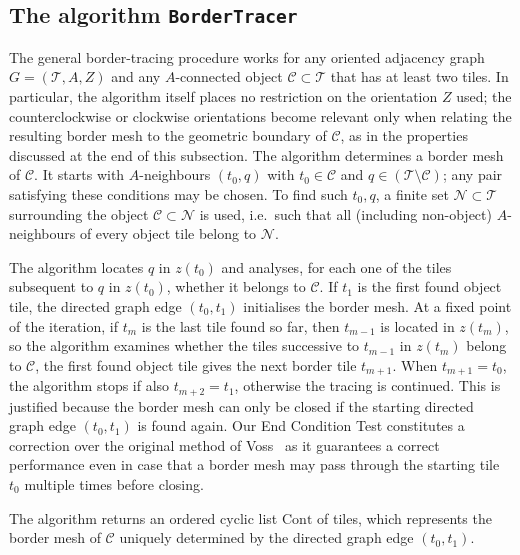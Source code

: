 \subsection{The algorithm \texttt{BorderTracer}}\label{subsec:bordertracer}

The general border-tracing procedure \cite[Algorithm~1]{WiederholdMatosWiederhold2026} works for any oriented adjacency graph $G = (\mathcal{T},A,Z)$ and any $A$-connected object $\mathcal{C}\subset\mathcal{T}$ that has at least two tiles.
In particular, the algorithm itself places no restriction on the orientation $Z$ used; the counterclockwise or clockwise orientations become relevant only when relating the resulting border mesh to the geometric boundary of $\mathcal{C}$, as in the properties discussed at the end of this subsection.
The algorithm determines a border mesh of $\mathcal{C}$.
It starts with $A$-neighbours $(t_0,q)$ with $t_0\in\mathcal{C}$ and $q\in (\mathcal{T}\setminus\mathcal{C})$; any pair satisfying these conditions may be chosen.
To find such $t_0,q$, a finite set $\mathcal{N}\subset\mathcal{T}$ surrounding the object $\mathcal{C}\subset\mathcal{N}$ is used, i.e.\ such that all (including non-object) $A$-neighbours of every object tile belong to $\mathcal{N}$.

The algorithm locates $q$ in $z(t_0)$ and analyses, for each one of the tiles subsequent to $q$ in $z(t_0)$, whether it belongs to $\mathcal{C}$.
If $t_1$ is the first found object tile, the directed graph edge $(t_0, t_1)$ initialises the border mesh.
At a fixed point of the iteration, if $t_m$ is the last tile found so far, then $t_{m-1}$ is located in $z(t_m)$, so the algorithm examines whether the tiles successive to $t_{m-1}$ in $z(t_m)$ belong to $\mathcal{C}$, the first found object tile gives the next border tile $t_{m+1}$.
When $t_{m+1}= t_0$, the algorithm stops if also $t_{m+2}= t_1$, otherwise the tracing is continued.
This is justified because the border mesh can only be closed if the starting directed graph edge $(t_0, t_1)$ is found again.
Our End Condition Test constitutes a correction over the original method of Voss~\cite{voss1993} as it guarantees a correct performance even in case that a border mesh may pass through the starting tile $t_0$ multiple times before closing.

The algorithm returns an ordered cyclic list $\mathrm{Cont}$ of tiles, which represents the border mesh of $\mathcal{C}$ uniquely determined by the directed graph edge $(t_0,t_1)$.

